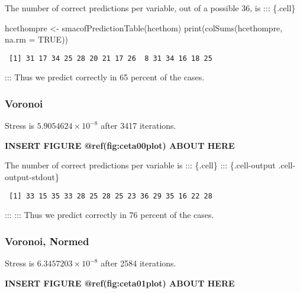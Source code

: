 \documentclass[
  12pt,
  letterpaper,
  DIV=11,
  numbers=noendperiod]{scrartcl}
\newenvironment{Shaded}{\begin{snugshade}}{\end{snugshade}}
\newcommand{\AttributeTok}[1]{\textcolor[rgb]{0.40,0.45,0.13}{#1}}
\newcommand{\ConstantTok}[1]{\textcolor[rgb]{0.56,0.35,0.01}{#1}}
\newcommand{\FunctionTok}[1]{\textcolor[rgb]{0.28,0.35,0.67}{#1}}
\newcommand{\NormalTok}[1]{\textcolor[rgb]{0.00,0.23,0.31}{#1}}
\newcommand{\OtherTok}[1]{\textcolor[rgb]{0.00,0.23,0.31}{#1}}
\begin{document}
The number of correct predictions per variable, out of a possible 36, is
::: \{.cell\}

\begin{Shaded}
\begin{Highlighting}[]
\NormalTok{hcethompre }\OtherTok{\textless{}{-}} \FunctionTok{smacofPredictionTable}\NormalTok{(hcethom)}
\FunctionTok{print}\NormalTok{(}\FunctionTok{colSums}\NormalTok{(hcethompre, }\AttributeTok{na.rm =} \ConstantTok{TRUE}\NormalTok{))}
\end{Highlighting}
\end{Shaded}

\begin{verbatim}
 [1] 31 17 34 25 28 20 21 17 26  8 31 34 16 18 25
\end{verbatim}

::: Thus we predict correctly in 65 percent of the cases.

\subsubsection{Voronoi}\label{voronoi-1}

Stress is \ensuremath{5.9054624\times 10^{-8}} after 3417 iterations.

\begin{greybox}

\begin{center}
\textbf{INSERT FIGURE @ref(fig:ceta00plot) ABOUT HERE}

\end{center}

\end{greybox}

The number of correct predictions per variable is ::: \{.cell\} :::
\{.cell-output .cell-output-stdout\}

\begin{verbatim}
 [1] 33 15 35 33 28 25 28 25 23 36 29 35 16 22 28
\end{verbatim}

::: ::: Thus we predict correctly in 76 percent of the cases.

\subsubsection{Voronoi, Normed}\label{voronoi-normed}

Stress is \ensuremath{6.3457203\times 10^{-8}} after 2584 iterations.

\begin{greybox}

\begin{center}
\textbf{INSERT FIGURE @ref(fig:ceta01plot) ABOUT HERE}

\end{center}

\end{greybox}
\end{document}
